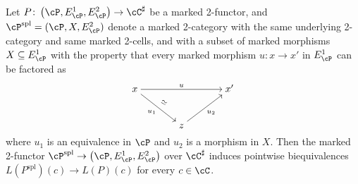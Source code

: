 \documentclass[11pt, dvipsnames]{amsart}
\begin{document}
\begin{lem}\label{lem.split.localization}
    Let $P\colon\markedscat{\cP}\to\Csharp$ be a marked 2-functor, and $\cP^\mathrm{spl}=(\cP,X,E^2_\cP)$ denote a marked 2-category with the same underlying 2-category and same marked 2-cells, and with a subset of marked morphisms $X\subseteq E^1_\cP$ with the property that every marked morphism $u\colon x\to x'$ in $E^1_\cP$ can be factored as
    \[\begin{tikzcd}[cramped,sep=scriptsize]
    	x && {} && {x'} \\
    	\\
    	&& z
    	\arrow["u", from=1-1, to=1-5]
    	\arrow["{u_1}"',"\mathrel{\rotatebox[origin=c]{-30}{$\simeq$}}", from=1-1, to=3-3]
    	\arrow["{u_2}"', from=3-3, to=1-5]
    \end{tikzcd}\]
    where $u_1$ is an equivalence in $\cP$ and $u_2$ is a morphism in $X$. Then the marked 2-functor $\cP^\mathrm{spl}\to \markedscat{\cP}$ over $\Csharp$ induces pointwise biequivalences $L(P^\mathrm{spl})(c)\to L(P)(c)$ for every $c\in\cC$.
\end{lem}
\end{document}

